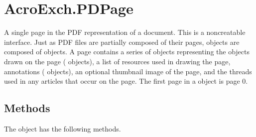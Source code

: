 \documentclass[letterpaper,12pt,english,openany,oneside]{sphinxmanual}
\begin{document}
\section{AcroExch.PDPage}
\label{\detokenize{IAC_API_OLE_Objects:acroexch-pdpage}}
A single page in the PDF representation of a document. This is a non\sphinxhyphen{}creatable interface. Just as PDF files are partially composed of their pages,  objects are composed of  objects. A page contains a series of objects representing the objects drawn on the page ( objects), a list of resources used in drawing the page, annotations ( objects), an optional thumbnail image of the page, and the threads used in any articles that occur on the page. The first page in a  object is page 0.


\subsection{Methods}
\label{\detokenize{IAC_API_OLE_Objects:methods-6}}\label{\detokenize{IAC_API_OLE_Objects:id19}}
The  object has the following methods.
\end{document}
